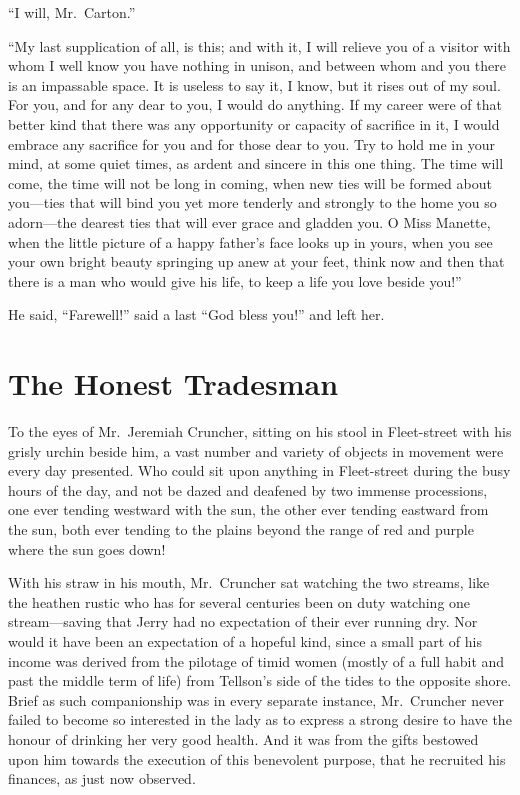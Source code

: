 ``I will, Mr.\ Carton.''

``My last supplication of all, is this; and with it, I will relieve
you of a visitor with whom I well know you have nothing in unison,
and between whom and you there is an impassable space.  It is useless
to say it, I know, but it rises out of my soul.  For you, and for any
dear to you, I would do anything.  If my career were of that better
kind that there was any opportunity or capacity of sacrifice in it,
I would embrace any sacrifice for you and for those dear to you.
Try to hold me in your mind, at some quiet times, as ardent and sincere
in this one thing.  The time will come, the time will not be long
in coming, when new ties will be formed about you---ties that will bind
you yet more tenderly and strongly to the home you so adorn---the dearest
ties that will ever grace and gladden you.  O Miss Manette, when the
little picture of a happy father's face looks up in yours, when you
see your own bright beauty springing up anew at your feet, think
now and then that there is a man who would give his life, to keep
a life you love beside you!''

He said, ``Farewell!'' said a last ``God bless you!'' and left her.



\chapter{The Honest Tradesman}


To the eyes of Mr.\ Jeremiah Cruncher, sitting on his stool in
Fleet-street with his grisly urchin beside him, a vast number and
variety of objects in movement were every day presented.  Who could
sit upon anything in Fleet-street during the busy hours of the day,
and not be dazed and deafened by two immense processions, one ever
tending westward with the sun, the other ever tending eastward
from the sun, both ever tending to the plains beyond the range of red
and purple where the sun goes down!

With his straw in his mouth, Mr.\ Cruncher sat watching the two streams,
like the heathen rustic who has for several centuries been on duty
watching one stream---saving that Jerry had no expectation of their
ever running dry.  Nor would it have been an expectation of a hopeful
kind, since a small part of his income was derived from the pilotage
of timid women (mostly of a full habit and past the middle term of life)
from Tellson's side of the tides to the opposite shore.  Brief as such
companionship was in every separate instance, Mr.\ Cruncher never
failed to become so interested in the lady as to express a strong desire
to have the honour of drinking her very good health.  And it was from
the gifts bestowed upon him towards the execution of this benevolent
purpose, that he recruited his finances, as just now observed.

